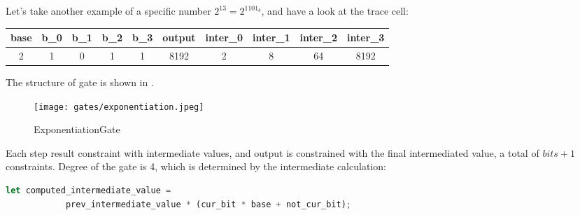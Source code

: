 Let's take another example of a specific number $2^{13} = 2^{1101_b}$, and have a look at the trace cell:
\begin{center}
    \begin{tabular}{ |c|c|c|c|c|c|c|c|c|c| }
        \hline
        base & b\_0 & b\_1 & b\_2 & b\_3 & output & inter\_0 & inter\_1 & inter\_2 & inter\_3 \\
        \hline
        2 & 1 & 0 & 1 & 1 & 8192 & 2 & 8 & 64 & 8192 \\
        \hline
    \end{tabular}
\end{center}

The structure of gate is shown in .
\begin{figure}[!ht]
    \centering
    \texttt{[image: gates/exponentiation.jpeg]}
    \caption{ExponentiationGate}
    \label{fig:exponetiation-gate}
\end{figure}

Each step result constraint with intermediate values, and output is constrained with the final intermediated value, a total of $bits + 1$ constraints.
Degree of the gate is 4, which is determined by the intermediate calculation:
\begin{lstlisting}[language=rust]
let computed_intermediate_value =
            prev_intermediate_value * (cur_bit * base + not_cur_bit);
\end{lstlisting}
